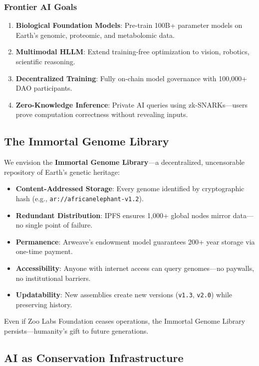 \documentclass[twocolumn,11pt]{article}
\begin{document}
\subsubsection{Frontier AI Goals}
\begin{enumerate}
    \item \textbf{Biological Foundation Models}: Pre-train 100B+ parameter models on Earth's genomic, proteomic, and metabolomic data.
    \item \textbf{Multimodal HLLM}: Extend training-free optimization to vision, robotics, scientific reasoning.
    \item \textbf{Decentralized Training}: Fully on-chain model governance with 100,000+ DAO participants.
    \item \textbf{Zero-Knowledge Inference}: Private AI queries using zk-SNARKs—users prove computation correctness without revealing inputs.
\end{enumerate}

\subsection{The Immortal Genome Library}

We envision the \textbf{Immortal Genome Library}—a decentralized, uncensorable repository of Earth's genetic heritage:

\begin{itemize}
    \item \textbf{Content-Addressed Storage}: Every genome identified by cryptographic hash (e.g., \texttt{ar://africanelephant-v1.2}).
    \item \textbf{Redundant Distribution}: IPFS ensures 1,000+ global nodes mirror data—no single point of failure.
    \item \textbf{Permanence}: Arweave's endowment model guarantees 200+ year storage via one-time payment.
    \item \textbf{Accessibility}: Anyone with internet access can query genomes—no paywalls, no institutional barriers.
    \item \textbf{Updatability}: New assemblies create new versions (\texttt{v1.3}, \texttt{v2.0}) while preserving history.
\end{itemize}

Even if Zoo Labs Foundation ceases operations, the Immortal Genome Library persists—humanity's gift to future generations.

\subsection{AI as Conservation Infrastructure}
\end{document}
